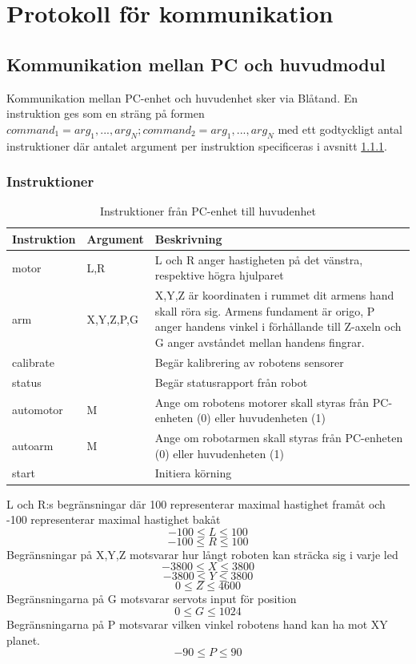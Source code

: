 \section{Protokoll för kommunikation}

\subsection{Kommunikation mellan PC och huvudmodul}\label{designspec:protokoll}

Kommunikation mellan PC-enhet och huvudenhet sker via Blåtand. En instruktion ges som en sträng på formen $command_{1}=arg_{1},...,arg_{N};command_{2}=arg_{1},...,arg_{N}$ med ett godtyckligt antal instruktioner där antalet argument per instruktion specificeras i avsnitt \ref{designspec-protokoll-pc-huvud-kommandon}.

\subsubsection{Instruktioner} \label{designspec-protokoll-pc-huvud-kommandon}

\begin{table}[h]
	\centering
		\begin{tabularx}{\textwidth}{| l | l | X |}
			\hline
			\textbf{Instruktion} & \textbf{Argument} & \textbf{Beskrivning} \\
			\hline
			{motor} & {L,R} & {L och R anger hastigheten på det vänstra, respektive högra hjulparet} \\
			\hline
			{arm} & {X,Y,Z,P,G} & {X,Y,Z är koordinaten i rummet dit armens hand skall röra sig. Armens fundament är origo, P anger handens vinkel i förhållande till Z-axeln och G anger avståndet mellan handens fingrar.} \\
			\hline
			{calibrate} & {} & {Begär kalibrering av robotens sensorer} \\
			\hline
			{status} & {} & {Begär statusrapport från robot} \\
			\hline
			{automotor} & {M} & {Ange om robotens motorer skall styras från PC-enheten (0) eller huvudenheten (1)} \\
			\hline
			{autoarm} & {M} & {Ange om robotarmen skall styras från PC-enheten (0) eller huvudenheten (1)} \\
			\hline
			{start} & {} & {Initiera körning} \\
			\hline
		\end{tabularx}
	\caption{Instruktioner från PC-enhet till huvudenhet} \label{protokoll:pc-huvud}
\end{table}
L och R:s begränsningar där 100 representerar maximal hastighet framåt och -100 representerar maximal hastighet bakåt
$$-100\leq L \leq 100$$
$$-100\leq R \leq 100$$
Begränsningar på X,Y,Z motsvarar hur långt roboten kan sträcka sig i varje led
$$-3800\leq X \leq 3800$$
$$-3800\leq Y \leq 3800$$
$$0\leq Z \leq 4600$$
Begränsningarna på G motsvarar servots input för position
$$0\leq G \leq 1024$$
Begränsningarna på P motsvarar vilken vinkel robotens hand kan ha mot XY planet.
$$-90\leq P \leq 90$$

